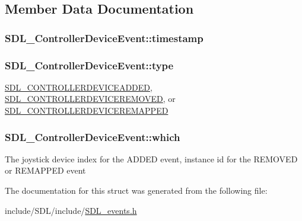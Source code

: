 \subsection{Member Data Documentation}
\hypertarget{struct_s_d_l___controller_device_event_a62945795fc17f5000fddc80e2cf921b8}{
\subsubsection[{timestamp}]{ S\-D\-L\-\_\-\-Controller\-Device\-Event\-::timestamp}}\label{struct_s_d_l___controller_device_event_a62945795fc17f5000fddc80e2cf921b8}
\hypertarget{struct_s_d_l___controller_device_event_a45b3807eaf70a5f5cf712455da277536}{
\subsubsection[{type}]{ S\-D\-L\-\_\-\-Controller\-Device\-Event\-::type}}\label{struct_s_d_l___controller_device_event_a45b3807eaf70a5f5cf712455da277536}
\hyperlink{_s_d_l__events_8h_a3b589e89be6b35c02e0dd34a55f3fccaa9642de478348da1aba4fb5791e8c5314}{S\-D\-L\-\_\-\-C\-O\-N\-T\-R\-O\-L\-L\-E\-R\-D\-E\-V\-I\-C\-E\-A\-D\-D\-E\-D}, \hyperlink{_s_d_l__events_8h_a3b589e89be6b35c02e0dd34a55f3fccaae00ac6995dfb7b92bfae68b9f47ae07a}{S\-D\-L\-\_\-\-C\-O\-N\-T\-R\-O\-L\-L\-E\-R\-D\-E\-V\-I\-C\-E\-R\-E\-M\-O\-V\-E\-D}, or \hyperlink{_s_d_l__events_8h_a3b589e89be6b35c02e0dd34a55f3fccaaeca87c7b5bb21915d444298449a78ee6}{S\-D\-L\-\_\-\-C\-O\-N\-T\-R\-O\-L\-L\-E\-R\-D\-E\-V\-I\-C\-E\-R\-E\-M\-A\-P\-P\-E\-D} \hypertarget{struct_s_d_l___controller_device_event_accb80de1619c1e790cffb6c888c915db}{
\subsubsection[{which}]{ S\-D\-L\-\_\-\-Controller\-Device\-Event\-::which}}\label{struct_s_d_l___controller_device_event_accb80de1619c1e790cffb6c888c915db}
The joystick device index for the A\-D\-D\-E\-D event, instance id for the R\-E\-M\-O\-V\-E\-D or R\-E\-M\-A\-P\-P\-E\-D event 

The documentation for this struct was generated from the following file\-:\begin{DoxyCompactItemize}
\item 
include/\-S\-D\-L/include/\hyperlink{_s_d_l__events_8h}{S\-D\-L\-\_\-events.\-h}\end{DoxyCompactItemize}
